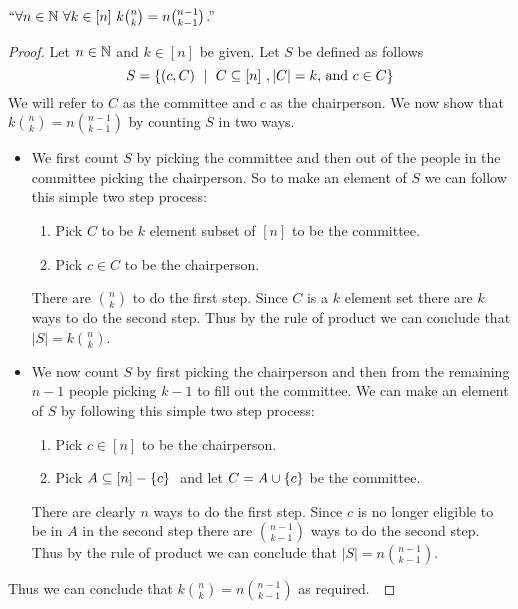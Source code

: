         \begin{theorem}
            $``\forall n \in \mathbb{N} \ \forall k \in [n] \ k \binom{n}{k} = n \binom{n - 1}{k - 1}$.''
        \end{theorem}
        \begin{proof}
            Let $n \in \mathbb{N}$ and $k \in [n]$ be given. Let $S$ be defined as follows
            \begin{equation}
                S = \Set{(c, C) \ \mid \ \subs{C}{[n]}, |C| = k \mbox{, and } c \in C}
            \end{equation}
            We will refer to $C$ as the committee and $c$ as the chairperson.
            We now show that $k \binom{n}{k} = n \binom{n - 1}{k - 1}$ by counting $S$ in
            two ways.
            \begin{itemize}
                \item
                    We first count $S$ by picking the committee and then out of the people
                    in the committee picking the chairperson. So to make an element of $S$
                    we can follow this simple two step process:
                    \begin{enumerate}
                        \item
                            Pick $C$ to be $k$ element subset of $[n]$ to be the committee.
                        \item
                            Pick $c \in C$ to be the chairperson.
                    \end{enumerate}
                    There are $\binom{n}{k}$ to do the first step. Since $C$ is a $k$
                    element set there are $k$ ways to do the second step. Thus by the
                    rule of product we can conclude that $|S| = k \binom{n}{k}$.
                \item
                    We now count $S$ by first picking the chairperson and then from the
                    remaining $n - 1$ people picking $k - 1$ to fill out the committee.
                    We can make an element of $S$ by following this simple two step process:
                    \begin{enumerate}
                        \item
                            Pick $c \in [n]$ to be the chairperson.
                        \item
                            Pick $A \subseteq [n] - \left\{c\right\} \ $ and let $C = A \cup \left\{c\right\}$
                            be the committee.
                    \end{enumerate}
                        There are clearly $n$ ways to do the first step. Since $c$ is no
                        longer eligible to be in $A$ in the second step there are $\binom{n - 1}{k - 1}$
                        ways to do the second step. Thus by the rule of product we can conclude
                        that $|S| = n \binom{n - 1}{k - 1}$.
            \end{itemize}
            Thus we can conclude that $k \binom{n}{k} = n \binom{n - 1}{k - 1}$
            as required.~\QED
        \end{proof}
